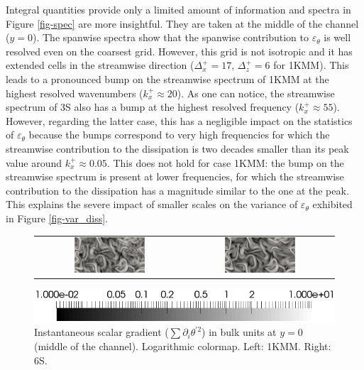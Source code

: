 \documentclass[review]{elsarticle}
\newcommand{\epst}{\varepsilon_\theta}
\begin{document}
Integral quantities provide only a limited amount of information and spectra in Figure \ref{fig-spec} are more insightful. They are taken at the middle of the channel ($y=0$). The spanwise spectra show that the spanwise contribution to $\epst$ is well resolved even on the coarsest grid. However, this grid is not isotropic and it has extended cells in the streamwise direction ($\Delta_x^+=17$, $\Delta_z^+=6$ for 1KMM). This leads to a pronounced bump on the streamwise spectrum of 1KMM at the highest resolved wavenumbers ($k_x^+\approx 20$). As one can notice, the streamwise spectrum of 3S also has a bump at the highest resolved frequency ($k_x^+\approx 55$). However, regarding the latter case, this has a negligible impact on the statistics of $\epst$ because the bumps correspond to very high frequencies for which the streamwise contribution to the dissipation is two decades smaller than its peak value around $k_x^+ \approx 0.05$. This does not hold for case 1KMM: the bump on the streamwise spectrum is present at lower frequencies, for which the streamwise contribution to the dissipation has a magnitude similar to the one at the peak. This explains the severe impact of smaller scales on the variance of $\epst$ exhibited in  Figure \ref{fig-var_diss}.

\begin{figure}[htbp]
\begin{center}
\begin{tabular}{cc}
\includegraphics[width=0.5\textwidth]{../visu/diss1KMM.png} & 
\includegraphics[width=0.5\textwidth]{../visu/diss6S.png}
\end{tabular}
\includegraphics[width=\textwidth]{../visu/diss_colorbar.png}
\end{center}
\caption{Instantaneous scalar gradient ($\sum \partial_i \theta^{\prime 2}$) in bulk units at $y=0$ (middle of the channel). Logarithmic colormap. Left: 1KMM. Right: 6S.}
\label{fig-visu}
\end{figure}
\end{document}
